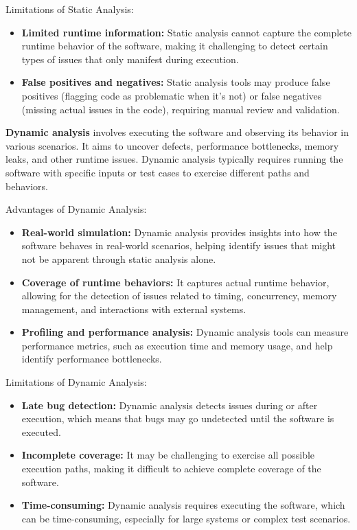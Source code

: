 Limitations of Static Analysis:

\begin{itemize}
    \item \textbf{Limited runtime information:} Static analysis cannot capture the complete runtime behavior of the software, making it challenging to detect certain types of issues that only manifest during execution.
    \item \textbf{False positives and negatives:} Static analysis tools may produce false positives (flagging code as problematic when it's not) or false negatives (missing actual issues in the code), requiring manual review and validation.
\end{itemize}

\textbf{Dynamic analysis} involves executing the software and observing its behavior in various scenarios. It aims to uncover defects, performance bottlenecks, memory leaks, and other runtime issues. Dynamic analysis typically requires running the software with specific inputs or test cases to exercise different paths and behaviors.

Advantages of Dynamic Analysis:

\begin{itemize}
    \item \textbf{Real-world simulation:} Dynamic analysis provides insights into how the software behaves in real-world scenarios, helping identify issues that might not be apparent through static analysis alone.
    \item \textbf{Coverage of runtime behaviors:} It captures actual runtime behavior, allowing for the detection of issues related to timing, concurrency, memory management, and interactions with external systems.
    \item \textbf{Profiling and performance analysis:} Dynamic analysis tools can measure performance metrics, such as execution time and memory usage, and help identify performance bottlenecks.
\end{itemize}

Limitations of Dynamic Analysis:

\begin{itemize}
    \item \textbf{Late bug detection:} Dynamic analysis detects issues during or after execution, which means that bugs may go undetected until the software is executed.
    \item \textbf{Incomplete coverage:} It may be challenging to exercise all possible execution paths, making it difficult to achieve complete coverage of the software.
    \item \textbf{Time-consuming:} Dynamic analysis requires executing the software, which can be time-consuming, especially for large systems or complex test scenarios.
\end{itemize}

